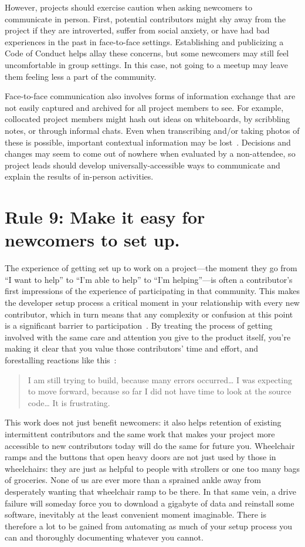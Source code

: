 \documentclass[10pt,letterpaper]{article}
\newcommand{\rulemajor}[1]{\section*{#1}}
\begin{document}
However,
projects should exercise caution when asking newcomers to communicate in person.
First, potential contributors might shy away from the project if they are introverted,
suffer from social anxiety,
or have had bad experiences in the past in face-to-face settings.
Establishing and publicizing a Code of Conduct helps allay these concerns,
but some newcomers may still feel uncomfortable in group settings.
In this case,
not going to a meetup may leave them feeling less a part of the community.

Face-to-face communication also involves forms of information exchange
that are not easily captured and archived for all project members to see.
For example,
collocated project members might hash out ideas on whiteboards,
by scribbling notes,
or through informal chats.
Even when transcribing and/or taking photos of these is possible,
important contextual information may be lost~\cite{cherubini2007}.
Decisions and changes may seem to come out of nowhere when evaluated by a non-attendee,
so project leads should develop universally-accessible ways to communicate and explain the results of in-person activities.

\rulemajor{Rule 9: Make it easy for newcomers to set up.}

The experience of getting set up to work on a project---the moment they go from ``I want to help''
to ``I'm able to help'' to ``I'm helping''---is often a contributor's first impressions of
the experience of participating in that community.
This makes the developer setup process a critical moment in your relationship with every new contributor,
which in turn means that any complexity or confusion at this point is a significant barrier to participation~\cite{steinmacher2014}.
By treating the process of getting involved with the same care and attention you give to the product itself,
you're making it clear that you value those contributors' time and effort,
and forestalling reactions like this~\cite{steinmacher2018b}:

\begin{quote}
  I am still trying to build, because many errors occurred{\ldots}
  I was expecting to move forward,
  because so far I did not have time to look at the source code{\ldots}
  It is frustrating.
\end{quote}

This work does not just benefit newcomers:
it also helps retention of existing intermittent contributors and the same work that makes your project more
accessible to new contributors today will do the same for future you.
Wheelchair ramps and the buttons that open heavy doors are not just used by those in wheelchairs:
they are just as helpful to people with strollers or one too many bags of groceries.
None of us are ever more than a sprained ankle away from desperately wanting that wheelchair ramp to be there.
In that same vein, a drive failure will someday force you to download a gigabyte of data
and reinstall some software, inevitably at the least convenient moment imaginable.
There is therefore a lot to be gained from automating as much of your setup process you can
and thoroughly documenting whatever you cannot.
\end{document}
